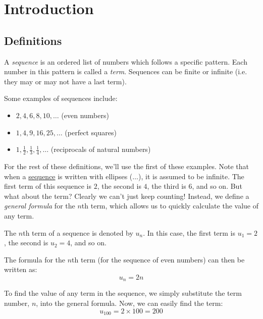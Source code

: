 \chapter{Introduction}
\section{Definitions}

\begin{definition}[Sequence]\label{def:sequence}
  A \textit{sequence} is an ordered list of numbers which follows
a specific pattern. Each number in this pattern is called a \textit{term}. Sequences
can be finite or infinite (i.e. they may or may not have a last term).
\end{definition}

\begin{eg}
  Some examples of sequences include:
  \begin{itemize}
    \item $2, 4, 6, 8, 10, \ldots$ (even numbers)
    \item $1, 4, 9, 16, 25, \ldots$ (perfect squares)
    \item $1, \frac{1}{2}, \frac{1}{3}, \frac{1}{4}, \ldots$ (reciprocals of natural numbers)
  \end{itemize}
  \vskip0.5cm
\end{eg}

\vskip0.2cm
For the rest of these definitions, we'll use the first of these examples. Note that when
a \hyperref[def:sequence]{sequence} is written with ellipses ($\ldots$), it is assumed to be infinite. The first term
of this sequence is $2$, the second is $4$, the third is $6$, and so on.
But what about the  term? Clearly we can't just keep counting! Instead, we define a \textit{general formula} for the $n$th term,
which allows us to quickly calculate the value of any term.

\begin{notation}
  The $n$th term of a sequence is denoted by $u_n$. In this case, the first term is $u_1=2$, the 
  second is $u_2=4$, and so on.
\end{notation}

The formula for the $n$th term (for the sequence of even numbers) can then be written as:
\begin{equation}
  u_n = 2n
\end{equation}

To find the value of any term in the sequence, we simply substitute the term number, $n$, into the general formula.
Now, we can easily find the  term:
\begin{equation*}
  u_{100} = 2 \times 100 = 200
\end{equation*}

